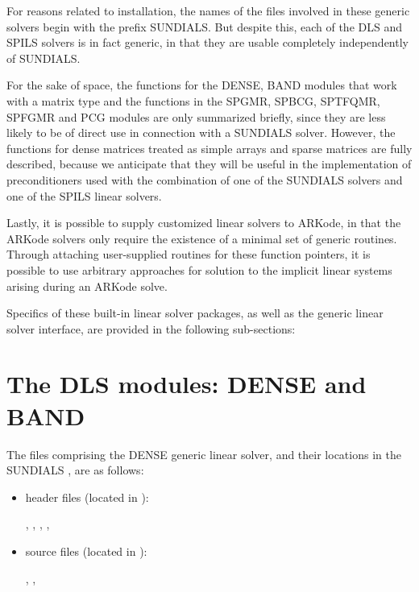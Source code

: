 \documentclass[letterpaper,10pt,english]{sphinxmanual}
\begin{document}
For reasons related to installation, the names of the files involved
in these generic solvers begin with the prefix SUNDIALS. But despite
this, each of the DLS and SPILS solvers is in fact generic, in that
they are usable completely independently of SUNDIALS.

For the sake of space, the functions for the DENSE, BAND modules
that work with a matrix type and the functions in the SPGMR, SPBCG,
SPTFQMR, SPFGMR and PCG modules are only summarized briefly, since
they are less likely to be of direct use in connection with a SUNDIALS
solver.  However, the functions for dense matrices treated as simple
arrays and sparse matrices are fully described, because we anticipate
that they will be useful in the implementation of preconditioners used
with the combination of one of the SUNDIALS solvers and one of the
SPILS linear solvers.

Lastly, it is possible to supply customized linear solvers to ARKode,
in that the ARKode solvers only require the existence of a minimal set
of generic routines.  Through attaching user-supplied routines for
these function pointers, it is possible to use arbitrary approaches
for solution to the implicit linear systems arising during an ARKode
solve.

Specifics of these built-in linear solver packages, as well as the
generic linear solver interface, are provided in the following
sub-sections:


\section{The DLS modules: DENSE and BAND}
\label{linear_solvers/DLS:linearsolvers-dls}\label{linear_solvers/DLS::doc}\label{linear_solvers/DLS:the-dls-modules-dense-and-band}
The files comprising the DENSE generic linear solver, and their
locations in the SUNDIALS , are as follows:
\begin{itemize}
\item {} 
header files (located in ):

, , ,
, 

\item {} 
source files (located in ):

, , 

\end{itemize}
\end{document}
